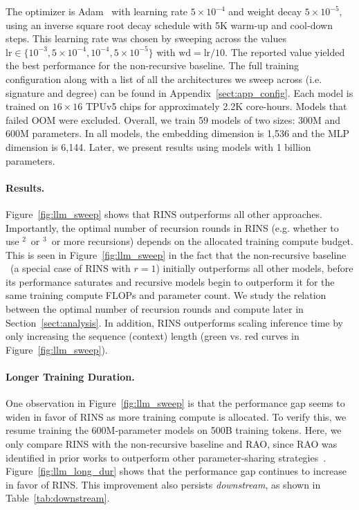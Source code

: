 The optimizer is Adam~\cite{kingma2014adam} with learning rate $5\times 10^{-4}$ and weight decay  $5\times 10^{-5}$, using an inverse square root decay schedule with 5K warm-up and cool-down steps. This learning rate was chosen by sweeping across the values $\mathrm{lr}\in\{10^{-3},5\times 10^{-4}, 10^{-4}, 5\times 10^{-5}\}$ with $\mathrm{wd}=\mathrm{lr}/10$. The reported value yielded the best performance for the non-recursive baseline. The full training configuration along with a list of all the architectures we sweep across (i.e. signature and degree) can be found in Appendix~\ref{sect:app_config}. Each model is trained on $16\times16$ TPUv5 chips for approximately 2.2K core-hours. Models that failed OOM were excluded. Overall, we train 59 models of two sizes: 300M and 600M parameters. In all models, the embedding dimension is 1,536 and the MLP dimension is 6,144. Later, we present results using models with 1 billion parameters.

\paragraph{Results.}Figure~\ref{fig:llm_sweep} shows that RINS outperforms all other approaches.  Importantly, the optimal number of recursion rounds in RINS (e.g. whether to use \A$^2$\B\ or \A$^3$\B\ or more recursions) depends on the allocated training compute budget. This is seen in Figure~\ref{fig:llm_sweep} in the fact that the non-recursive baseline \A\B\ (a special case of RINS with $r=1$) initially outperforms all other models, before its performance saturates and recursive models begin to outperform it for the same training compute FLOPs and parameter count. We study the relation between the optimal number of recursion rounds and compute later in Section~\ref{sect:analysis}. In addition, RINS outperforms scaling inference time by only increasing the sequence (context) length (green vs. red curves in Figure~\ref{fig:llm_sweep}). 

\paragraph{Longer Training Duration.}One observation in Figure~\ref{fig:llm_sweep} is that the performance gap seems to widen in favor of RINS as more training compute is allocated. To verify this, we resume training the  600M-parameter models on 500B training tokens. Here, we only compare RINS with the non-recursive baseline and RAO, since RAO was identified in prior works to outperform other parameter-sharing strategies~\cite{liu2024mobilellm}.  Figure~\ref{fig:llm_long_dur} shows that the performance gap continues to increase in favor of RINS. This improvement also persists \emph{downstream}, as shown in Table~\ref{tab:downstream}.



